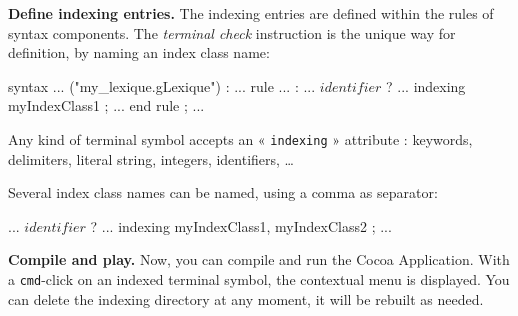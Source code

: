\noindent{} \textbf{Define indexing entries.} The indexing entries are defined within the rules of syntax components. The \emph{terminal check} instruction is the unique way for definition, by naming an index class name:

\begin{galgascode}
syntax ... ("my_lexique.gLexique") :
  ...
rule ... :
  ...
  $identifier$ ? ... indexing myIndexClass1 ;
  ...
end rule ;
  ...
\end{galgascode}

Any kind of terminal symbol accepts an « \texttt{indexing} » attribute : keywords, delimiters, literal string, integers, identifiers, \dots

Several index class names can be named, using a comma as separator:
\begin{galgascode}
  ...
  $identifier$ ? ... indexing myIndexClass1, myIndexClass2 ;
  ...
\end{galgascode}






\noindent{} \textbf{Compile and play.} Now, you can compile and run the Cocoa Application. With a \texttt{cmd}-click on an indexed terminal symbol, the contextual menu is displayed. You can delete the indexing directory at any moment, it will be rebuilt as needed.







